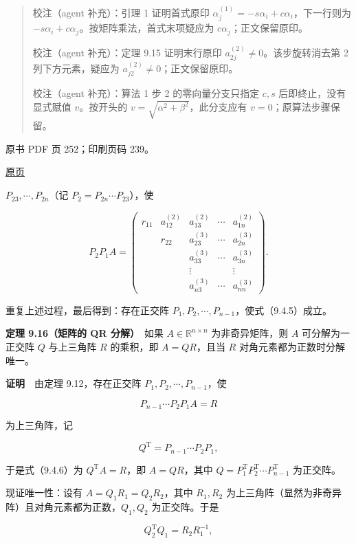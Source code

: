 \begin{quote}
校注（agent 补充）：引理 1 证明首式原印 \(\alpha_j^{(1)}=-s\alpha_i+c\alpha_i\)，下一行则为 \(-s\alpha_i+c\alpha_j\)。按矩阵乘法，首式末项疑应为 \(c\alpha_j\)；正文保留原印。

校注（agent 补充）：定理 9.15 证明末行原印 \(a_{2j}^{(2)}\ne0\)。该步旋转消去第 2 列下方元素，疑应为 \(a_{j2}^{(2)}\ne0\)；正文保留原印。

校注（agent 补充）：算法 1 步 2 的零向量分支只指定 \(c,s\) 后即终止，没有显式赋值 \(v\)。按开头的 \(v=\sqrt{\alpha^2+\beta^2}\)，此分支应有 \(v=0\)；原算法步骤保留。
\end{quote}

\clearpage

原书 PDF 页 252；印刷页码 239。

\href{source-images/pdf-252.jpeg}{原页}

\(P_{23},\cdots,P_{2n}\)（记 \(P_2=P_{2n}\cdots P_{23}\)），使

\[
P_2P_1A=\begin{pmatrix}
r_{11}&a_{12}^{(2)}&a_{13}^{(2)}&\cdots&a_{1n}^{(2)}\\
&r_{22}&a_{23}^{(3)}&\cdots&a_{2n}^{(3)}\\
&&a_{33}^{(3)}&\cdots&a_{3n}^{(3)}\\
&&\vdots&&\vdots\\
&&a_{n3}^{(3)}&\cdots&a_{nn}^{(3)}
\end{pmatrix}.
\]

重复上述过程，最后得到：存在正交阵 \(P_1,P_2,\cdots,P_{n-1}\)，使式（9.4.5）成立。

\textbf{定理 9.16（矩阵的 QR 分解）}　如果 \(A\in\mathbb R^{n\times n}\) 为非奇异矩阵，则 \(A\) 可分解为一正交阵 \(Q\) 与上三角阵 \(R\) 的乘积，即 \(A=QR\)，且当 \(R\) 对角元素都为正数时分解唯一。

\textbf{证明}　由定理 9.12，存在正交阵 \(P_1,P_2,\cdots,P_{n-1}\)，使

\[
P_{n-1}\cdots P_2P_1A=R
\tag{9.4.6}
\]

为上三角阵，记

\[
Q^{\mathrm T}=P_{n-1}\cdots P_2P_1,
\]

于是式（9.4.6）为 \(Q^{\mathrm T}A=R\)，即 \(A=QR\)，其中 \(Q=P_1^{\mathrm T}P_2^{\mathrm T}\cdots P_{n-1}^{\mathrm T}\) 为正交阵。

现证唯一性：设有 \(A=Q_1R_1=Q_2R_2\)，其中 \(R_1,R_2\) 为上三角阵（显然为非奇异阵）且对角元素都为正数，\(Q_1,Q_2\) 为正交阵。于是

\[
Q_2^{\mathrm T}Q_1=R_2R_1^{-1},
\tag{9.4.7}
\]

